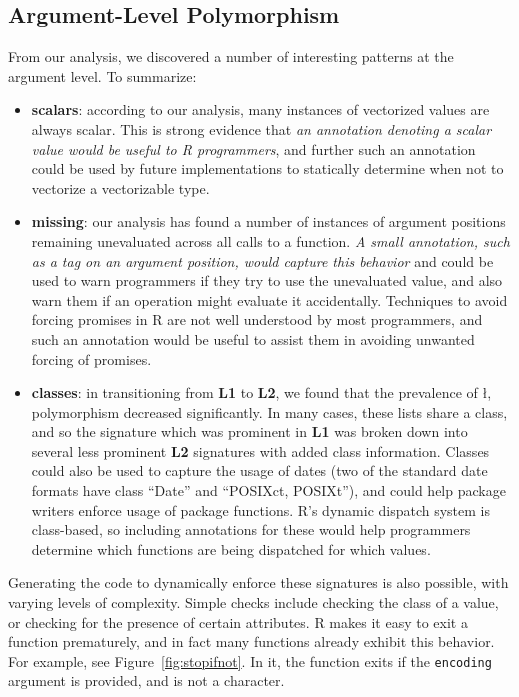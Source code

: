 \documentclass[acmsmall,10pt,review,anonymous]{acmart}\settopmatter{printfolios=true,printccs=false,printacmref=false}
\begin{document}
%
%
%
%
\subsection{Argument-Level Polymorphism}

From our analysis, we discovered a number of interesting patterns at the argument level.
To summarize:

\begin{itemize}

	\item {\bf scalars}: according to our analysis, many instances of vectorized values are always scalar.
	This is strong evidence that {\it an annotation denoting a scalar value would be useful to R programmers}, and further such an annotation could be used by future implementations to statically determine when not to vectorize a vectorizable type.
	
	\item {\bf missing}: our analysis has found a number of instances of argument positions remaining unevaluated across all calls to a function.
	{\it A small annotation, such as a tag on an argument position, would capture this behavior} and could be used to warn programmers if they try to use the unevaluated value, and also warn them if an operation might evaluate it accidentally.
	Techniques to avoid forcing promises in R are not well understood by most programmers, and such an annotation would be useful to assist them in avoiding unwanted forcing of promises.

	\item {\bf classes}: in transitioning from {\bf L1} to {\bf L2}, we found that the prevalence of \l,  polymorphism decreased significantly.
	In many cases, these lists share a class, and so the signature which was prominent in {\bf L1} was broken down into several less prominent {\bf L2} signatures with added class information.
	Classes could also be used to capture the usage of dates (two of the standard date formats have class ``Date'' and ``POSIXct, POSIXt''), and could help package writers enforce usage of package functions.
	R's dynamic dispatch system is class-based, so including annotations for these would help programmers determine which functions are being dispatched for which values.

\end{itemize}

Generating the code to dynamically enforce these signatures is also possible, with varying levels of complexity.
Simple checks include checking the class of a value, or checking for the presence of certain attributes.
R makes it easy to exit a function prematurely, and in fact many functions already exhibit this behavior.
For example, see Figure~\ref{fig:stopifnot}.
In it, the function exits if the {\tt encoding} argument is provided, and is not a character.
\end{document}

